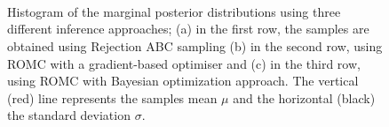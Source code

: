 \begin{figure}[h]
  \begin{center}
    
    \\
    
    \\
    
    \\
    \end{center}
    \caption[MA2 example, evaluation of the marginal
    distributions.]{Histogram of the marginal posterior distributions
      using three different inference approaches; (a) in the first
      row, the samples are obtained using Rejection ABC sampling (b)
      in the second row, using ROMC with a gradient-based optimiser
      and (c) in the third row, using ROMC with Bayesian optimization
      approach. The vertical (red) line represents the samples mean
      $\mu$ and the horizontal (black) the standard deviation
      $\sigma$.}
  \label{fig:ma2_3}
\end{figure}




